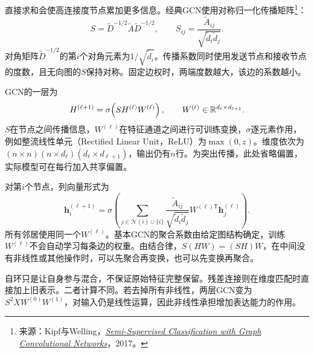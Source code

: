 直接求和会使高连接度节点累加更多信息。经典GCN使用对称归一化传播矩阵\footnote{来源：Kipf与Welling，\href{https://arxiv.org/abs/1609.02907}{\textit{Semi-Supervised Classification with Graph Convolutional Networks}}，2017。}：
\begin{equation}
 S=\widetilde D^{-1/2}\widetilde A\widetilde D^{-1/2},\qquad
 S_{ij}=\frac{\widetilde A_{ij}}{\sqrt{\widetilde d_i\widetilde d_j}}.
 \label{eq:graph-gcn-propagation}
\end{equation}
对角矩阵$\widetilde D^{-1/2}$的第$i$个对角元素为$1/\sqrt{\widetilde d_i}$。传播系数同时使用发送节点和接收节点的度数，且无向图的$S$保持对称。固定边权时，两端度数越大，该边的系数越小。

GCN的一层为
\begin{equation}
 H^{(\ell+1)}=\sigma\!\left(SH^{(\ell)}W^{(\ell)}\right),\qquad
 W^{(\ell)}\in\mathbb{R}^{d_\ell\times d_{\ell+1}}.
 \label{eq:graph-gcn-layer}
\end{equation}
$S$在节点之间传播信息，$W^{(\ell)}$在特征通道之间进行可训练变换，$\sigma$逐元素作用，例如整流线性单元（Rectified Linear Unit，ReLU）为$\max(0,z)$。维度依次为$(n\times n)(n\times d_\ell)(d_\ell\times d_{\ell+1})$，输出仍有$n$行。为突出传播，此处省略偏置，实际模型可在每行加入共享偏置。

对第$i$个节点，列向量形式为
\begin{equation}
 \bm h_i^{(\ell+1)}=\sigma\!\left(
 \sum_{j\in\mathcal N(i)\cup\{i\}}
 \frac{\widetilde A_{ij}}{\sqrt{\widetilde d_i\widetilde d_j}}
 W^{(\ell)\mathsf T}\bm h_j^{(\ell)}\right).
 \label{eq:graph-gcn-node}
\end{equation}
所有邻居使用同一个$W^{(\ell)}$。基本GCN的聚合系数由给定图结构确定，训练$W^{(\ell)}$不会自动学习每条边的权重。由结合律，$S(HW)=(SH)W$，在中间没有非线性或其他操作时，可以先聚合再变换，也可以先变换再聚合。

自环只是让自身参与混合，不保证原始特征完整保留。残差连接则在维度匹配时直接加上旧表示。二者计算不同。若去掉所有非线性，两层GCN变为$S^2XW^{(0)}W^{(1)}$，对输入仍是线性运算，因此非线性承担增加表达能力的作用。

